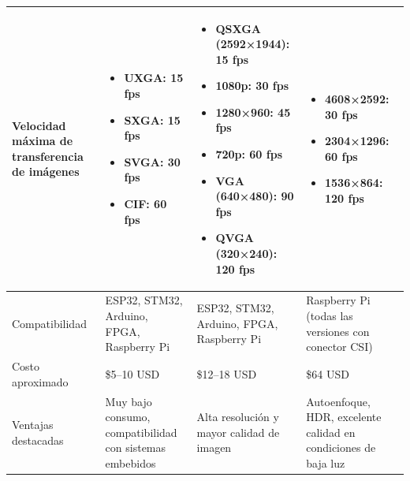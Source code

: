 \begin{longtable}{
    |p{3cm}
    |p{3.5cm}
    |p{3.5cm}
    |p{3.5cm}|
}
Velocidad máxima de transferencia de imágenes 
    & \begin{itemize}[leftmargin=*]
        \item UXGA: 15 fps 
        \item SXGA: 15 fps 
        \item SVGA: 30 fps 
        \item CIF: 60 fps
      \end{itemize}
    & \begin{itemize}[leftmargin=*]
        \item QSXGA (2592×1944): 15 fps 
        \item 1080p: 30 fps 
        \item 1280×960: 45 fps 
        \item 720p: 60 fps 
        \item VGA (640×480): 90 fps 
        \item QVGA (320×240): 120 fps
      \end{itemize} 
    & \begin{itemize}[leftmargin=*]
        \item 4608×2592: 30 fps 
        \item 2304×1296: 60 fps 
        \item 1536×864: 120 fps
     \end{itemize}\\ \hline

Compatibilidad 
    & ESP32, STM32, Arduino, FPGA, Raspberry Pi 
    & ESP32, STM32, Arduino, FPGA, Raspberry Pi 
    & Raspberry Pi (todas las versiones con conector CSI)\\ \hline

Costo aproximado 
    & \$5--10 USD 
    & \$12--18 USD
    & \$64 USD\\ \hline

Ventajas destacadas 
    & Muy bajo consumo, compatibilidad con sistemas embebidos 
    & Alta resolución y mayor calidad de imagen 
    &Autoenfoque, HDR, excelente calidad en condiciones de baja luz\\ \hline


\end{longtable}
